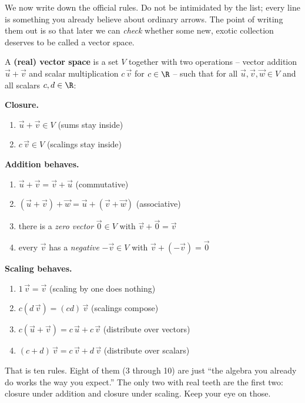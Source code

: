 We now write down the official rules. Do not be intimidated by the list; every line is
something you already believe about ordinary arrows. The point of writing them out is so
that later we can \emph{check} whether some new, exotic collection deserves to be called
a vector space.

\begin{formalbox}
A \textbf{(real) vector space} is a set $V$ together with two operations -- vector
addition $\vec{u} + \vec{v}$ and scalar multiplication $c\,\vec{v}$ for $c \in \R$ --
such that for all $\vec{u},\vec{v},\vec{w} \in V$ and all scalars $c,d \in \R$:

\smallskip
\textbf{Closure.}
\begin{enumerate}[label=(\arabic*)]
  \item $\vec{u} + \vec{v} \in V$ \hfill (sums stay inside)
  \item $c\,\vec{v} \in V$ \hfill (scalings stay inside)
\end{enumerate}

\textbf{Addition behaves.}
\begin{enumerate}[label=(\arabic*),start=3]
  \item $\vec{u} + \vec{v} = \vec{v} + \vec{u}$ \hfill (commutative)
  \item $(\vec{u} + \vec{v}) + \vec{w} = \vec{u} + (\vec{v} + \vec{w})$ \hfill (associative)
  \item there is a \emph{zero vector} $\vec{0}\in V$ with $\vec{v} + \vec{0} = \vec{v}$
  \item every $\vec{v}$ has a \emph{negative} $-\vec{v}\in V$ with $\vec{v} + (-\vec{v}) = \vec{0}$
\end{enumerate}

\textbf{Scaling behaves.}
\begin{enumerate}[label=(\arabic*),start=7]
  \item $1\,\vec{v} = \vec{v}$ \hfill (scaling by one does nothing)
  \item $c(d\,\vec{v}) = (cd)\,\vec{v}$ \hfill (scalings compose)
  \item $c(\vec{u} + \vec{v}) = c\,\vec{u} + c\,\vec{v}$ \hfill (distribute over vectors)
  \item $(c + d)\,\vec{v} = c\,\vec{v} + d\,\vec{v}$ \hfill (distribute over scalars)
\end{enumerate}
\end{formalbox}

That is ten rules. Eight of them (3 through 10) are just ``the algebra you already do
works the way you expect.'' The only two with real teeth are the first two: closure under
addition and closure under scaling. Keep your eye on those.

